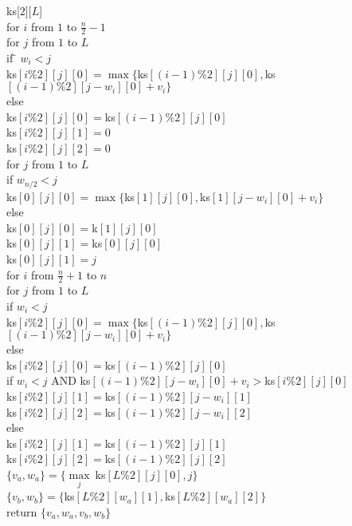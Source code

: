 \documentclass{article}
\begin{document}
\begin{enumerate}
\begin{enumerate}
\begin{tabbing}
\>ks[$2][L$]\\
\>for $i$ from $1$ to $\frac{n}{2}-1$\\
\>\>for $j$ from $1$ to $L$\\
\>\>\>if \= $w_i<j$\\
\>\>\>\>ks$[i\%2][j][0]=\max \{$ks$[(i-1)\%2][j][0],$ks$[(i-1)\%2][j-w_i][0]+v_i\}$\\
\>\>\>else\\
\>\>\>\>ks$[i\%2][j][0]=$ks$[(i-1)\%2][j][0]$\\
\>\>\>ks$[i\%2][j][1]=0$\\
\>\>\>ks$[i\%2][j][2]=0$\\
\>for $j$ from $1$ to $L$\\
\>\>if $w_{n/2}<j$\\
\>\>\>ks$[0][j][0]=\max \{$ks$[1][j][0],$ks$[1][j-w_i][0]+v_i\}$\\
\>\>else\\
\>\>\>ks$[0][j][0]=$k$[1][j][0]$\\
\>\>ks$[0][j][1]=$ks$[0][j][0]$\\
\>\>ks$[0][j][1]=j$\\
\>for $i$ from $\frac{n}{2}+1$ to $n$\\
\>\>for $j$ from $1$ to $L$\\
\>\>\>if  $w_i<j$\\
\>\>\>\>ks$[i\%2][j][0]=\max \{$ks$[(i-1)\%2][j][0],$ks$[(i-1)\%2][j-w_i][0]+v_i\}$\\
\>\>\>else\\
\>\>\>\>ks$[i\%2][j][0]=$ks$[(i-1)\%2][j][0]$\\
\>\>\>if $w_i<j$ AND ks$[(i-1)\%2][j-w_i][0]+v_i>$ks$[i\%2][j][0]$\\
\>\>\>\>ks$[i\%2][j][1]=$ks$[(i-1)\%2][j-w_i][1]$\\
\>\>\>\>ks$[i\%2][j][2]=$ks$[(i-1)\%2][j-w_i][2]$\\
\>\>\>else\\
\>\>\>\>ks$[i\%2][j][1]=$ks$[(i-1)\%2][j][1]$\\
\>\>\>\>ks$[i\%2][j][2]=$ks$[(i-1)\%2][j][2]$\\
\>$\{v_a,w_a\}=\{\max \limits_{j}^{} \ $ks$[L\%2][j][0],j\}$\\
\>$\{v_b,w_b\}=\{$ks$[L\%2][w_a][1],$ks$[L\%2][w_a][2]\}$\\
\>return $\{v_a,w_a,v_b,w_b\}$
\end{tabbing}
\ 



\end{enumerate}
\end{enumerate}
\end{document}
